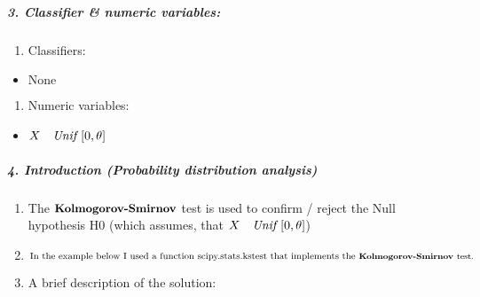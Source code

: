 \documentclass[11pt]{article}
\providecommand{\tightlist}{%
      \setlength{\itemsep}{0pt}\setlength{\parskip}{0pt}}
\begin{document}
    \hypertarget{classifier-numeric-variables}{%
\subparagraph{3. Classifier \& numeric
variables:}\label{classifier-numeric-variables}}

\begin{enumerate}
\def\labelenumi{\arabic{enumi}.}
\tightlist
\item
  Classifiers:
\end{enumerate}

\begin{itemize}
\tightlist
\item
  \(\text{None}\)
\end{itemize}

\begin{enumerate}
\def\labelenumi{\arabic{enumi}.}
\setcounter{enumi}{1}
\tightlist
\item
  Numeric variables:
\end{enumerate}

\begin{itemize}
\tightlist
\item
  \(\space\space X \text{ ~ } \textit{Unif }[0, \theta]\)
\end{itemize}

    \hypertarget{introduction-probability-distribution-analysis}{%
\subparagraph{4. Introduction (Probability distribution
analysis)}\label{introduction-probability-distribution-analysis}}

\begin{enumerate}
\def\labelenumi{\arabic{enumi}.}
\tightlist
\item
  The \(\small{\textbf{Kolmogorov-Smirnov}}\) test is used to confirm /
  reject the Null hypothesis H0 (which assumes, that
  \(\space\space X \text{ ~ } \textit{Unif }[0, \theta]\))
\item
  \(\text{In the example below I used a function scipy.stats.kstest that implements the}\small{\textbf{ Kolmogorov-Smirnov }}\text{test.}\)
\item
  A brief description of the solution:
\end{enumerate}
\end{document}
